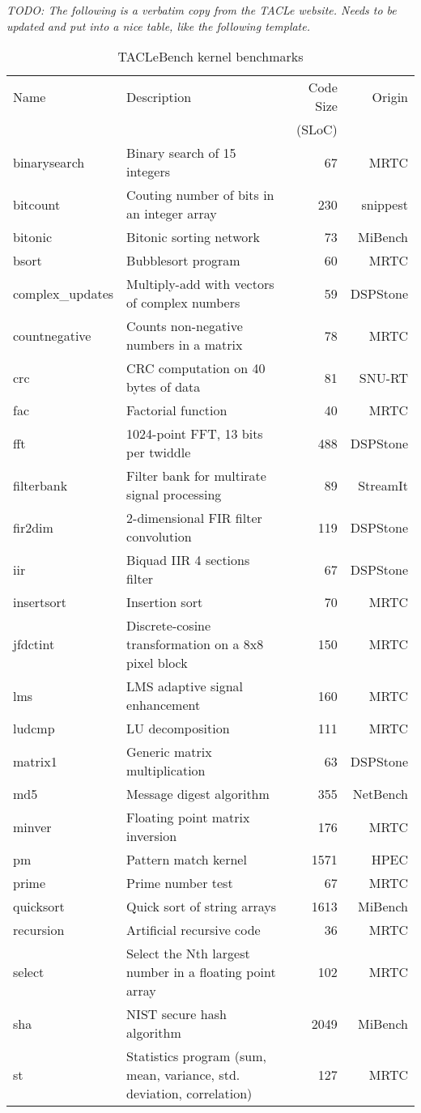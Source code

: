 \documentclass[a4paper,UKenglish]{oasics}
\newcommand{\todo}[1]{{\emph{TODO: #1}}}
\begin{document}
\todo{The following is a verbatim copy from the TACLe website.
Needs to be updated and put into a nice table, like the following template.}

\begin{table}
\centering
\caption{\label{tab:bench_kernel}TACLeBench kernel benchmarks}  
\begin{tabular}{lp{6cm}rr}
\toprule
Name & Description & Code Size & Origin\\
     &             &     (SLoC) & \\ \midrule
binarysearch & Binary search of 15 integers & 67 & MRTC \\
bitcount & Couting number of bits in an integer array & 230  & snippest \\
bitonic &  Bitonic sorting network  & 73 & MiBench \\
bsort & Bubblesort program & 60 & MRTC \\
complex\_updates &  Multiply-add with vectors of complex numbers & 59 & DSPStone \\
countnegative &  Counts non-negative numbers in a matrix  & 78 & MRTC \\
crc &  CRC computation on 40 bytes of data  & 81 & SNU-RT \\
fac &  Factorial function & 40 & MRTC \\
fft &  1024-point FFT, 13 bits per twiddle  & 488  & DSPStone \\
filterbank & Filter bank for multirate signal processing  & 89 & StreamIt \\
fir2dim &  2-dimensional FIR filter convolution & 119 & DSPStone \\
iir &  Biquad IIR 4 sections filter & 67 & DSPStone \\
insertsort & Insertion sort & 70 & MRTC \\
jfdctint & Discrete-cosine transformation on a 8x8 pixel block  & 150  & MRTC \\
lms &  LMS adaptive signal enhancement  & 160  & MRTC \\
ludcmp & LU decomposition & 111 & MRTC \\
matrix1 &  Generic matrix multiplication  & 63 & DSPStone \\
md5 &  Message digest algorithm & 355  & NetBench \\
minver & Floating point matrix inversion  & 176  & MRTC \\
pm & Pattern match kernel & 1571  & HPEC \\
prime &  Prime number test  & 67 & MRTC \\
quicksort &  Quick sort of string arrays  & 1613 & MiBench \\
recursion &  Artificial recursive code  & 36 & MRTC \\
select & Select the Nth largest number in a floating point array  & 102 & MRTC \\
sha &  NIST secure hash algorithm & 2049  & MiBench \\
st & Statistics program (sum, mean, variance, std. deviation, correlation)  & 127  & MRTC \\
\bottomrule
\end{tabular}
\end{table}
\end{document}
